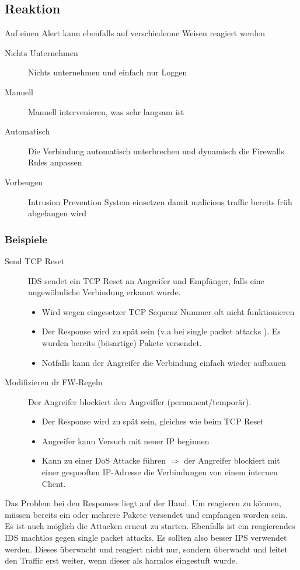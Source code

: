 \subsection{Reaktion}
Auf einen Alert kann ebenfalls auf verschiedenne Weisen reagiert werden
\begin{description}
	\item[Nichts Unternehmen] Nichts unternehmen und einfach nur Loggen
	\item[Manuell] Manuell intervenieren, was sehr langsam ist
	\item[Automatisch] Die Verbindung automatisch unterbrechen und dynamisch die Firewalls Rules anpassen
	\item[Vorbeugen] Intrusion Prevention System einsetzen damit malicious traffic bereits früh abgefangen wird
\end{description}

\subsubsection{Beispiele}
\begin{description}
    \item[Send TCP Reset] IDS sendet ein TCP Reset an Angreifer und Empfänger, falls eine ungewöhnliche Verbindung erkannt wurde.
    \begin{itemize}
        \item Wird wegen eingesetzer TCP Sequenz Nummer oft nicht funktionieren
        \item Der Response wird zu spät sein (v.a bei \glqq single packet attacks \grqq). Es wurden bereits (bösartige) Pakete versendet.
        \item Notfalls kann der Angreifer die Verbindung einfach wieder aufbauen
    \end{itemize}
    \item[Modifizieren dr FW-Regeln] Der Angreifer blockiert den Angreiffer (permanent/temporär).
    \begin{itemize}
        \item Der Response wird zu spät sein, gleiches wie beim TCP Reset
        \item Angreifer kann Versuch mit neuer IP beginnen
        \item Kann zu einer DoS Attacke führen $\Rightarrow$ der Angreifer blockiert mit einer gespooften IP-Adresse die Verbindungen von einem internen Client.
    \end{itemize}
\end{description}
Das Problem bei den Responses liegt auf der Hand. Um reagieren zu können, müssen bereits ein oder mehrere Pakete versendet und empfangen worden sein. Es ist auch möglich die Attacken erneut zu starten. Ebenfalls ist ein reagierendes IDS machtlos gegen single packet attacks. Es sollten also besser IPS verwendet werden. Dieses überwacht und reagiert nicht nur, sondern überwacht und leitet den Traffic erst weiter, wenn dieser als harmlos eingestuft wurde.
    

